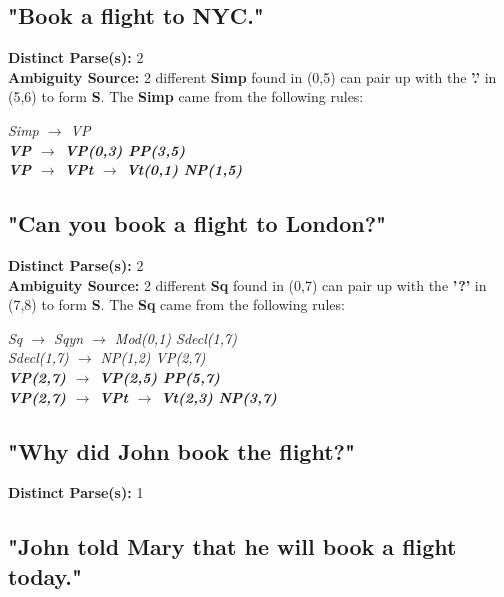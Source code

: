 \documentclass{article}
\begin{document}
\subsection{"Book a flight to NYC."}

\textbf{Distinct Parse(s):} 2\\

\textbf{Ambiguity Source:} 2 different \textbf{Simp} found in (0,5) can pair up with the \textbf{'.'} in (5,6) to form \textbf{S}. The \textbf{Simp} came from the following rules:

\begin{center}
	\emph{Simp $\rightarrow$ VP}\\
	\textbf{\emph{VP $\rightarrow$ VP(0,3) PP(3,5)}\\
	\emph{VP $\rightarrow$ VPt $\rightarrow$ Vt(0,1) NP(1,5)}}
\end{center}

\subsection{"Can you book a flight to London?"}

\textbf{Distinct Parse(s):} 2\\

\textbf{Ambiguity Source:} 2 different \textbf{Sq} found in (0,7) can pair up with the \textbf{'?'} in (7,8) to form \textbf{S}. The \textbf{Sq} came from the following rules:

\begin{center}
	\emph{Sq $\rightarrow$ Sqyn $\rightarrow$ Mod(0,1) Sdecl(1,7)}\\
	\emph{Sdecl(1,7) $\rightarrow$ NP(1,2) VP(2,7)}\\
	\textbf{\emph{VP(2,7) $\rightarrow$ VP(2,5) PP(5,7)}\\
	\emph{VP(2,7) $\rightarrow$ VPt $\rightarrow$ Vt(2,3) NP(3,7)}}
\end{center}

\subsection{"Why did John book the flight?"}

\textbf{Distinct Parse(s):} 1

\subsection{"John told Mary that he will book a flight today."}
\end{document}
